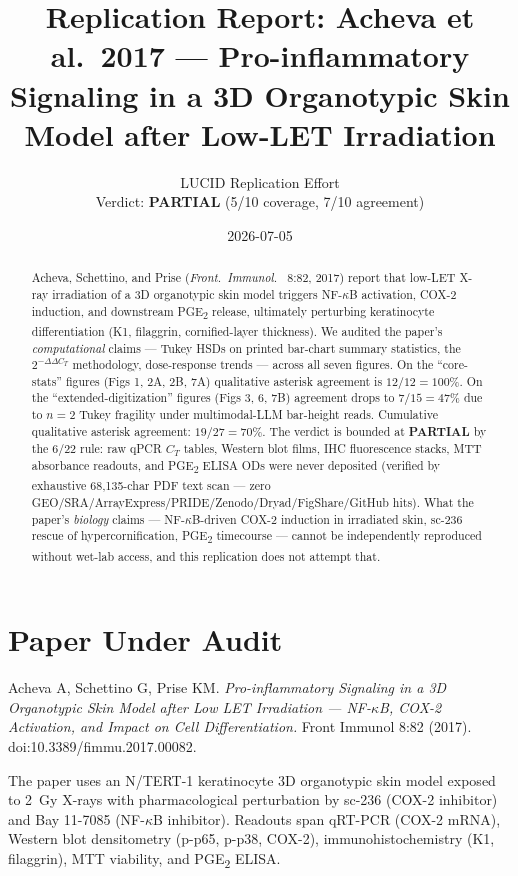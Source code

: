\documentclass[11pt]{article}
\title{Replication Report: Acheva et al.\ 2017 --- Pro-inflammatory Signaling in a 3D Organotypic Skin Model after Low-LET Irradiation}
\author{LUCID Replication Effort \\ Verdict: \textbf{PARTIAL} (5/10 coverage, 7/10 agreement)}
\date{2026-07-05}
\begin{document}
\maketitle

\begin{abstract}
Acheva, Schettino, and Prise (\emph{Front.\ Immunol.\ } 8:82, 2017) report that low-LET X-ray irradiation of a 3D organotypic skin model triggers NF-$\kappa$B activation, COX-2 induction, and downstream PGE\textsubscript{2} release, ultimately perturbing keratinocyte differentiation (K1, filaggrin, cornified-layer thickness). We audited the paper's \emph{computational} claims --- Tukey HSDs on printed bar-chart summary statistics, the $2^{-\Delta\Delta C_T}$ methodology, dose-response trends --- across all seven figures. On the ``core-stats'' figures (Figs 1, 2A, 2B, 7A) qualitative asterisk agreement is $12/12 = 100\%$. On the ``extended-digitization'' figures (Figs 3, 6, 7B) agreement drops to $7/15 = 47\%$ due to $n=2$ Tukey fragility under multimodal-LLM bar-height reads. Cumulative qualitative asterisk agreement: $19/27 = 70\%$. The verdict is bounded at \textbf{PARTIAL} by the 6/22 rule: raw qPCR $C_T$ tables, Western blot films, IHC fluorescence stacks, MTT absorbance readouts, and PGE\textsubscript{2} ELISA ODs were never deposited (verified by exhaustive 68{,}135-char PDF text scan --- zero GEO/SRA/ArrayExpress/PRIDE/Zenodo/Dryad/FigShare/GitHub hits). What the paper's \emph{biology} claims --- NF-$\kappa$B-driven COX-2 induction in irradiated skin, sc-236 rescue of hypercornification, PGE\textsubscript{2} timecourse --- cannot be independently reproduced without wet-lab access, and this replication does not attempt that.
\end{abstract}

\section{Paper Under Audit}

Acheva A, Schettino G, Prise KM. \emph{Pro-inflammatory Signaling in a 3D Organotypic Skin Model after Low LET Irradiation --- NF-$\kappa$B, COX-2 Activation, and Impact on Cell Differentiation.} Front Immunol 8:82 (2017). doi:10.3389/fimmu.2017.00082.

The paper uses an N/TERT-1 keratinocyte 3D organotypic skin model exposed to 2~Gy X-rays with pharmacological perturbation by sc-236 (COX-2 inhibitor) and Bay 11-7085 (NF-$\kappa$B inhibitor). Readouts span qRT-PCR (COX-2 mRNA), Western blot densitometry (p-p65, p-p38, COX-2), immunohistochemistry (K1, filaggrin), MTT viability, and PGE\textsubscript{2} ELISA.
\end{document}
